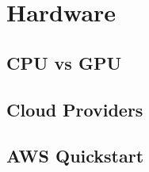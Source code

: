 \section{Hardware}

\subsection{CPU vs GPU}

\subsection{Cloud Providers}

\subsection{AWS Quickstart}